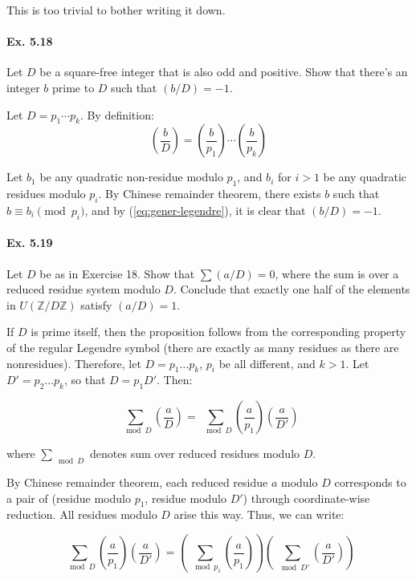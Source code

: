 \documentclass[notitlepage]{article}
\theoremstyle{definition}
\newcommand\Z{\mathbb{Z}}
\begin{document}
This is too trivial to bother writing it down.

\paragraph{Ex. 5.18}
Let $D$ be a square-free integer that is also odd and positive. Show
that there's an integer $b$ prime to $D$ such that $(b/D) = -1$.

Let $D = p_1 \cdots p_k$. By definition:
\begin{equation}
  \label{eq:gener-legendre}
  \left(\frac{b}{D}\right) = \left(\frac{b}{p_1}\right) \cdots \left(\frac{b}{p_k}\right)
\end{equation}

Let $b_1$ be any quadratic non-residue modulo $p_1$, and $b_i$ for $i
> 1$ be any quadratic residues modulo $p_i$. By Chinese remainder
theorem, there exists $b$ such that $b \equiv b_i \pmod {p_i}$, and by
(\ref{eq:gener-legendre}), it is clear that $(b/D) = -1$.

\paragraph{Ex. 5.19}
Let $D$ be as in Exercise 18. Show that $\sum (a/D) = 0$, where the
sum is over a reduced residue system modulo $D$. Conclude that exactly
one half of the elements in $U(\Z/D\Z)$ satisfy $(a/D) = 1$.

If $D$ is prime itself, then the proposition follows from the
corresponding property of the regular Legendre symbol (there are
exactly as many residues as there are nonresidues). Therefore, let $D
= p_1 \ldots p_k$, $p_i$ be all different, and $k > 1$. Let $D' = p_2
\ldots p_k$, so that $D = p_1 D'$. Then:

\begin{equation}
  \sum_{\mod D} \left(\frac{a}{D}\right) = \sum_{\mod D}
  \left(\frac{a}{p_1}\right) \left(\frac{a}{D'}\right)
\end{equation}
 
where $\sum_{\mod D}$ denotes sum over reduced residues modulo $D$.

By Chinese remainder theorem, each reduced residue $a$ modulo $D$
corresponds to a pair of (residue modulo $p_1$, residue modulo $D'$)
through coordinate-wise reduction. All residues modulo $D$ arise this
way. Thus, we can write:

\begin{equation}
  \sum_{\mod D} \left(\frac{a}{p_1}\right) \left(\frac{a}{D'}\right) =
  \left(\sum_{\mod p_1} \left(\frac{a}{p_1}\right)\right)
  \left(\sum_{\mod D'}\left(\frac{a}{D'}\right)\right)
\end{equation}
\end{document}
